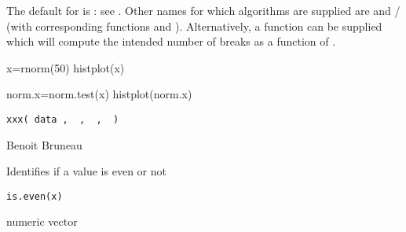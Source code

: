 \documentclass[a4paper]{book}
\begin{document}
%
\begin{Details}\relax
The default for  is : see
.  Other names for which algorithms
are supplied are  and  /
 (with corresponding functions
 and ).
Alternatively, a function can be supplied which
will compute the intended number of breaks as a function of .
\end{Details}
%
\begin{SeeAlso}\relax
{}
\end{SeeAlso}
%
\begin{Examples}
\begin{ExampleCode}
x=rnorm(50)
histplot(x)

norm.x=norm.test(x)
histplot(norm.x)  
\end{ExampleCode}
\end{Examples}
\newpage
{}
%
\begin{Usage}
\begin{verbatim}
xxx( data ,  ,  ,  )
\end{verbatim}
\end{Usage}
%
\begin{Arguments}
\begin{ldescription}
\item[\code{data}] 


\end{ldescription}
\end{Arguments}
%
\begin{Author}\relax
Benoit Bruneau
\end{Author}
\newpage
{}
%
\begin{Description}\relax
Identifies if a value is even or not
\end{Description}
%
\begin{Usage}
\begin{verbatim}
is.even(x)
\end{verbatim}
\end{Usage}
%
\begin{Arguments}
\begin{ldescription}
\item[\code{x}] numeric vector
\end{ldescription}
\end{Arguments}
\end{document}
